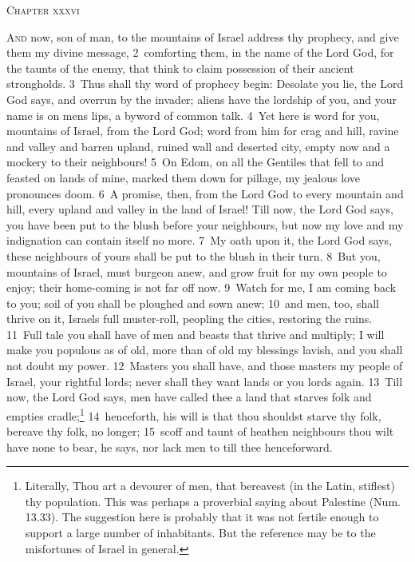 \documentclass[10pt]{book} %
\begin{document}
\begin{large}\begin{center}\textsc{Chapter xxxvi}\end{center}\end{large}
\lettrine[lines=2]{A}{nd} now, son of man, to the mountains of Israel address thy prophecy, and give them my divine message, \textcolor{benred8}{2}~comforting them, in the name of the Lord God, for the taunts of the enemy, that think to claim possession of their ancient strongholds. \textcolor{benred8}{3}~Thus shall thy word of prophecy begin: Desolate you lie, the Lord God says, and overrun by the invader; aliens have the lordship of you, and your name is on men\textquotesingle s lips, a byword of common talk. \textcolor{benred8}{4}~Yet here is word for you, mountains of Israel, from the Lord God; word from him for crag and hill, ravine and valley and barren upland, ruined wall and deserted city, empty now and a mockery to their neighbours! \textcolor{benred8}{5}~On Edom, on all the Gentiles that fell to and feasted on lands of mine, marked them down for pillage, my jealous love pronounces doom. \textcolor{benred8}{6}~A promise, then, from the Lord God to every mountain and hill, every upland and valley in the land of Israel! Till now, the Lord God says, you have been put to the blush before your neighbours, but now my love and my indignation can contain itself no more. \textcolor{benred8}{7}~My oath upon it, the Lord God says, these neighbours of yours shall be put to the blush in their turn.
\textcolor{benred8}{8}~But you, mountains of Israel, must burgeon anew, and grow fruit for my own people to enjoy; their home-coming is not far off now. \textcolor{benred8}{9}~Watch for me, I am coming back to you; soil of you shall be ploughed and sown anew; \textcolor{benred8}{10}~and men, too, shall thrive on it, Israel\textquotesingle s full muster-roll, peopling the cities, restoring the ruins. \textcolor{benred8}{11}~Full tale you shall have of men and beasts that thrive and multiply; I will make you populous as of old, more than of old my blessings lavish, and you shall not doubt my power. \textcolor{benred8}{12}~Masters you shall have, and those masters my people of Israel, your rightful lords; never shall they want lands or you lords again. \textcolor{benred8}{13}~Till now, the Lord God says, men have called thee a land that starves folk and empties cradle;\footnote[1]{Literally, \textasciigrave Thou art a devourer of men, that bereavest (in the Latin, stiflest) thy population\textquotesingle . This was perhaps a proverbial saying about Palestine (Num. 13.33). The suggestion here is probably that it was not fertile enough to support a large number of inhabitants. But the reference may be to the misfortunes of Israel in general.} \textcolor{benred8}{14}~henceforth, his will is that thou shouldst starve thy folk, bereave thy folk, no longer; \textcolor{benred8}{15}~scoff and taunt of heathen neighbours thou wilt have none to bear, he says, nor lack men to till thee henceforward.
\end{document}
